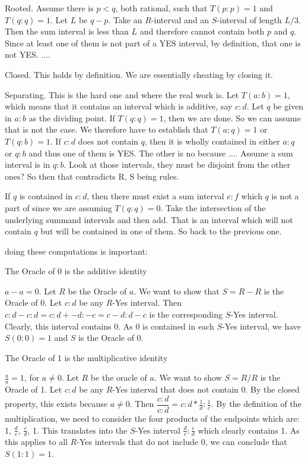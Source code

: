 \documentclass[12pt]{article}
\theoremstyle{remark}
\begin{document}
Rooted. Assume there is $p<q$, both rational, such that $T(p:p)=1$ and $T(q:q) =1$. Let $L$ be $q-p$. Take an $R$-interval and an $S$-interval of length $L/3$. Then the sum interval is less than $L$ and therefore cannot contain both $p$ and $q$. Since at least one of them is not part of a YES interval, by definition, that one is not YES.  .... 

Closed. This holds by definition. We are essentially cheating by closing it. 

Separating. This is the hard one and where the real work is. Let $T(a:b) = 1$, which means that it contains an interval which is additive, say $c:d$. Let $q$ be given in $a:b$ as the dividing point. If $T(q:q) = 1$, then we are done. So we can assume that is not the case. We therefore have to establish that $T(a:q)=1$ or $T(q:b) = 1$. If $c:d$ does not contain $q$, then it is wholly contained in either $a:q$ or $q:b$ and thus one of them is YES. The other is no because .... Assume a sum interval is in $q:b$. Look at those intervals, they must be disjoint from the other ones? So then that contradicts R, S being rules. 

If $q$ is contained in $c:d$, then there must exist a sum interval $e:f$ which $q$ is not a part of since we are assuming $T(q:q)=0$. Take the intersection of the underlying summand intervals and then add. That is an interval which will not contain $q$ but will be contained in one of them. So back to the previous one. 



doing these computations is important:

The Oracle of 0 is the additive identity

$a-a = 0$. Let $R$ be the Oracle of $a$. We want to show that $S= R-R$ is the Oracle of 0. Let $c:d$ be any $R$-Yes interval. Then $c:d-c:d = c:d+ -d:-c = c-d:d-c$ is the corresponding $S$-Yes interval. Clearly, this interval contains 0. As 0 is contained in each $S$-Yes interval, we have $S(0:0)=1$ and $S$ is the Oracle of 0. 

The Oracle of 1 is the multiplicative identity

$\tfrac{a}{a} = 1$, for $a \neq 0$. Let $R$ be the oracle of $a$. We want to show $S=R/R$ is the Oracle of 1. Let $c:d$ be any $R$-Yes interval that does not contain 0. By the closed property, this exists because $a \neq 0$. Then $\dfrac{c:d}{c:d} = c:d * \tfrac{1}{d}:\tfrac{1}{c}$. By the definition of the multiplication, we need to consider the four products of the endpoints which are: 1, $\tfrac{d}{c}$, $\tfrac{c}{d}$, 1. This translates into the $S$-Yes interval $\tfrac{d}{c}:\tfrac{c}{d}$ which clearly contains 1. As this applies to all $R$-Yes intervals that do not include 0, we can conclude that $S(1:1) =1$.
\end{document}
